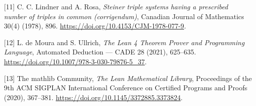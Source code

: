 \documentclass[english,11pt,a4paper]{article}
\begin{document}
{[}11{]} C. C. Lindner and A. Rosa, \emph{Steiner triple systems having a prescribed number of triples in common (corrigendum)}, Canadian Journal of Mathematics 30(4) (1978), 896. \url{https://doi.org/10.4153/CJM-1978-077-9}.

{[}12{]} L. de Moura and S. Ullrich, \emph{The Lean 4 Theorem Prover and Programming Language}, Automated Deduction --- CADE 28 (2021), 625--635. \url{https://doi.org/10.1007/978-3-030-79876-5_37}.

{[}13{]} The mathlib Community, \emph{The Lean Mathematical Library}, Proceedings of the 9th ACM SIGPLAN International Conference on Certified Programs and Proofs (2020), 367--381. \url{https://doi.org/10.1145/3372885.3373824}.

\endgroup
\end{document}
